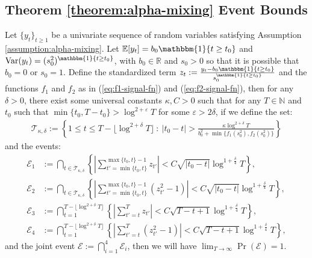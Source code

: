 \subsection{Theorem \ref{theorem:alpha-mixing} Event Bounds}

\begin{lemma}\label{lemma:thm4-event-bound}

Let $\{y_t\}_{t\geq 1}$ be a univariate sequence of random variables satisfying Assumption \ref{assumption:alpha-mixing}. Let $\E[y_t] = b_0\mathbbm{1}\{t\geq t_0\}$ and $\normalfont{\Var}(y_t) = (s_0^2)^{\mathbbm{1}\{t\geq t_0\}}$, with $b_0 \in \mathbb{R}$ and $s_0 > 0$ so that it is possible that $b_0 = 0$ or $s_0 = 1$. Define the standardized term $z_t:= \frac{y_t - b_0\mathbbm{1}\{t\geq t_0\}}{s_0^{\mathbbm{1}\{t\geq t_0\}}}$ and the functions $f_1$ and $f_2$ as in (\ref{eq:f1-signal-fn}) and (\ref{eq:f2-signal-fn}), then for any $\delta > 0$, there exist some universal constants $\kappa, C > 0$ such that for any $T\in\mathbb{N}$ and $t_0$ such that $\min\{t_0,T-t_0\} > \log^{2+\varepsilon} T$ for some $\varepsilon > 2\delta$, if we define the set:
\begin{align*}
    \mathcal{T}_{\kappa,\delta}:= \left\{1\leq t \leq T - \lfloor\log^{2 + \delta} T\rfloor \::\: |t_0 - t| > \frac{\kappa\log^{2 + \delta} T}{b^2_0 + \min\{f_1(s_0^2),f_2(s_0^2)\}} \right\}
\end{align*}
and the events: 
\begin{align*}
    \mathcal{E}_1 &:= \bigcap_{t \in \mathcal{T}_{\kappa, \delta}} \left\{\left|\sum_{t'=\min\{t_0,t\}}^{\max\{t_0,t\}-1} z_{t'}\right| < C\sqrt{|t_0-t|}\log^{1+\frac{\delta}{4}} T\right\}, \\
    \mathcal{E}_2 &:= \bigcap_{t \in \mathcal{T}_{\kappa, \delta}} \left\{\left|\sum_{t'=\min\{t_0,t\}}^{\max\{t_0,t\}-1} (z_{t'}^2 - 1) \right| <  C\sqrt{|t_0-t|}\log^{1+\frac{\delta}{4}} T  \right\},  \\
    \mathcal{E}_3 &:= \bigcap_{t=1}^{T- \lfloor\log^{2 +\delta} T\rfloor }  \left\{\left|\sum_{t'=t}^{T} z_{t'}\right| < C\sqrt{T-t+1}\log^{1+\frac{\delta}{4}} T  \right\}, \\
    \mathcal{E}_4 &:= \bigcap_{t=1}^{T- \lfloor\log^{2 +\delta} T \rfloor} \left\{\left|\sum_{t'=t}^{T} (z_{t'}^2 - 1) \right| <  C\sqrt{T-t+1}\log^{1+\frac{\delta}{4}} T  \right\},
\end{align*}
and the joint event $\mathcal{E} := \bigcap_{i=1}^4 \mathcal{E}_i$, then we will have $\lim_{T\to\infty} \Pr(\mathcal{E}) = 1$. 
\end{lemma}

